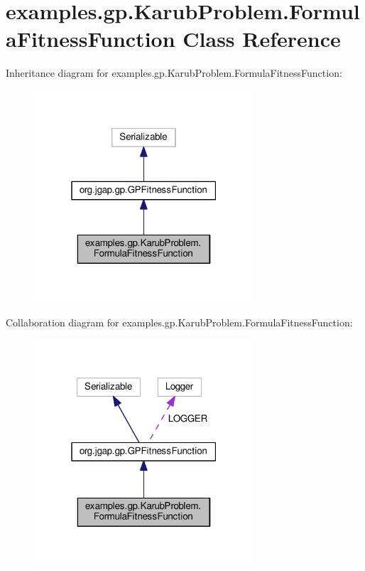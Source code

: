 \hypertarget{classexamples_1_1gp_1_1_karub_problem_1_1_formula_fitness_function}{\section{examples.\-gp.\-Karub\-Problem.\-Formula\-Fitness\-Function Class Reference}
\label{classexamples_1_1gp_1_1_karub_problem_1_1_formula_fitness_function}
}


Inheritance diagram for examples.\-gp.\-Karub\-Problem.\-Formula\-Fitness\-Function\-:
\nopagebreak
\begin{figure}[H]
\begin{center}
\leavevmode
\includegraphics[width=232pt]{classexamples_1_1gp_1_1_karub_problem_1_1_formula_fitness_function__inherit__graph}
\end{center}
\end{figure}


Collaboration diagram for examples.\-gp.\-Karub\-Problem.\-Formula\-Fitness\-Function\-:
\nopagebreak
\begin{figure}[H]
\begin{center}
\leavevmode
\includegraphics[width=232pt]{classexamples_1_1gp_1_1_karub_problem_1_1_formula_fitness_function__coll__graph}
\end{center}
\end{figure}

